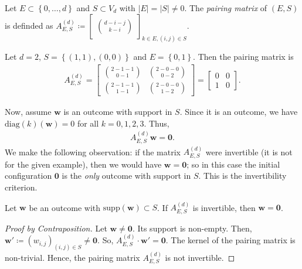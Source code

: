 \begin{definition}\label{def:pairing-matrix}
    Let \( E \subset \left\{ 0, \dots, d \right\} \) and \( S \subset V_d \) with \( \lvert E \rvert = \lvert S \rvert \neq 0 \). The \emph{pairing matrix} of \( (E,S) \) is definded as \( A^{(d)}_{E,S} \coloneqq \begin{bmatrix} \binom{d-i-j}{k-i} \end{bmatrix}_{k \in E, (i,j) \in S} \).
\end{definition}

\begin{example}
    Let \( d = 2 \), \( S = \left\{ (1,1), (0,0) \right\} \) and \( E = \left\{ 0,1 \right\} \). Then the pairing matrix is
    \begin{align*}
        A^{(d)}_{E,S}  = \begin{bmatrix}
            \binom{2-1-1}{0-1} & \binom{2-0-0}{0-2} \\
            \binom{2-1-1}{1-1}  & \binom{2-0-0}{1-2}
        \end{bmatrix} = \begin{bmatrix}
            0 & 0 \\
            1 & 0
        \end{bmatrix}.
    \end{align*}

    Now, assume \( \mathbf{w} \) is an outcome with support in \( S \). Since it is an outcome, we have \( \mathrm{diag}(k)(\mathbf{w}) = 0 \) for all \( k = 0, 1,2,3 \). Thus, 
    \begin{align*}
        A^{(d)}_{E,S} \mathbf w = \mathbf 0.
    \end{align*}
    We make the following observation: if the matrix \( A^{(d)}_{E,S} \) were invertible (it is not for the given example), then we would have \( \mathbf w = \mathbf 0 \); so in this case the initial configuration \( \mathbf{0} \) is the \emph{only} outcome with support in \( S \). This is the invertibility criterion. 
\end{example}

\begin{proposition}
    Let \( \mathbf{w} \) be an outcome with \( \mathrm{supp}(\mathbf w) \subset S \).
    If \( A^{(d)}_{E,S} \) is invertible, then \( \mathbf{w} = \mathbf 0 \).
\end{proposition}

\begin{proof}[Proof by Contraposition]
    Let \( \mathbf{w} \neq \mathbf 0 \). Its support is non-empty. Then, \( \mathbf w' \coloneqq (w_{i,j})_{(i,j) \in S} \neq \mathbf 0 \). So, \( A^{(d)}_{E,S} \cdot \mathbf w' = \mathbf 0 \). The kernel of the pairing matrix is non-trivial. Hence, the pairing matrix \( A^{(d)}_{E,S} \) is not invertible.
\end{proof}

